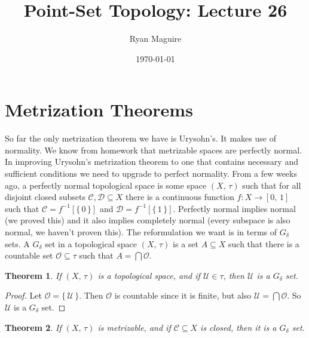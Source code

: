 \documentclass{article}
\title{Point-Set Topology: Lecture 26}
\author{Ryan Maguire}
\date{\today}
\theoremstyle{plain}
\newtheorem{theorem}{Theorem}[section]
\theoremstyle{normal}
\newenvironment{definition}{%
    \pushQED{\qed}\renewcommand{\qedsymbol}{$\blacksquare$}\definitionx%
}{%
    \popQED\enddefinitionx%
}
\begin{document}
    \maketitle
    \section{Metrization Theorems}
        So far the only metrization theorem we have is Urysohn's. It makes use
        of normality. We know from homework that metrizable spaces are
        perfectly normal. In improving Urysohn's metrization theorem to one
        that contains necessary and sufficient conditions we need to upgrade
        to perfect normality. From a few weeks ago, a perfectly normal
        topological space is some space $(X,\,\tau)$ such that for all
        disjoint closed subsets $\mathcal{C},\mathcal{D}\subseteq{X}$ there is
        a continuous function $f:X\rightarrow[0,\,1]$ such that
        $\mathcal{C}=f^{-1}[\{\,0\,\}]$ and $\mathcal{D}=f^{-1}[\{\,1\,\}]$.
        Perfectly normal implies normal (we proved this) and it also implies
        completely normal (every subspace is also normal, we haven't proven
        this). The reformulation we want is in terms of $G_{\delta}$ sets.
        \begin{definition}[\textbf{$G_{\delta}$ Set}]
            A $G_{\delta}$ set in a topological space $(X,\,\tau)$ is a set
            $A\subseteq{X}$ such that there is a countable set
            $\mathcal{O}\subseteq\tau$ such that $A=\bigcap\mathcal{O}$.
        \end{definition}
        \begin{theorem}
            If $(X,\,\tau)$ is a topological space, and if $\mathcal{U}\in\tau$,
            then $\mathcal{U}$ is a $G_{\delta}$ set.
        \end{theorem}
        \begin{proof}
            Let $\mathcal{O}=\{\,\mathcal{U}\,\}$. Then $\mathcal{O}$ is
            countable since it is finite, but also
            $\mathcal{U}=\bigcap\mathcal{O}$. So $\mathcal{U}$ is a
            $G_{\delta}$ set.
        \end{proof}
        \begin{theorem}
            If $(X,\,\tau)$ is metrizable, and if $\mathcal{C}\subseteq{X}$ is
            closed, then it is a $G_{\delta}$ set.
        \end{theorem}
\end{document}
